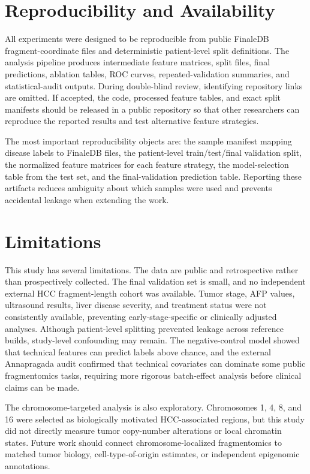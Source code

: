 \documentclass[conference]{IEEEtran}
\begin{document}
\section{Reproducibility and Availability}
All experiments were designed to be reproducible from public FinaleDB fragment-coordinate files and deterministic patient-level split definitions. The analysis pipeline produces intermediate feature matrices, split files, final predictions, ablation tables, ROC curves, repeated-validation summaries, and statistical-audit outputs. During double-blind review, identifying repository links are omitted. If accepted, the code, processed feature tables, and exact split manifests should be released in a public repository so that other researchers can reproduce the reported results and test alternative feature strategies.

The most important reproducibility objects are: the sample manifest mapping disease labels to FinaleDB files, the patient-level train/test/final validation split, the normalized feature matrices for each feature strategy, the model-selection table from the test set, and the final-validation prediction table. Reporting these artifacts reduces ambiguity about which samples were used and prevents accidental leakage when extending the work.

\section{Limitations}
This study has several limitations. The data are public and retrospective rather than prospectively collected. The final validation set is small, and no independent external HCC fragment-length cohort was available. Tumor stage, AFP values, ultrasound results, liver disease severity, and treatment status were not consistently available, preventing early-stage-specific or clinically adjusted analyses. Although patient-level splitting prevented leakage across reference builds, study-level confounding may remain. The negative-control model showed that technical features can predict labels above chance, and the external Annapragada audit confirmed that technical covariates can dominate some public fragmentomics tasks, requiring more rigorous batch-effect analysis before clinical claims can be made.

The chromosome-targeted analysis is also exploratory. Chromosomes 1, 4, 8, and 16 were selected as biologically motivated HCC-associated regions, but this study did not directly measure tumor copy-number alterations or local chromatin states. Future work should connect chromosome-localized fragmentomics to matched tumor biology, cell-type-of-origin estimates, or independent epigenomic annotations.
\end{document}

